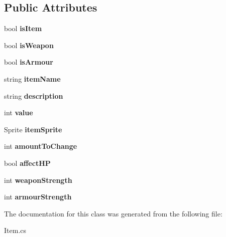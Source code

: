 \subsection*{Public Attributes}
\begin{DoxyCompactItemize}
\item 
\mbox{\label{class_item_ab0385c6416fcce30b328d5cbb98a6081}} 
bool {\bfseries is\+Item}
\item 
\mbox{\label{class_item_a6b69379b7bc2f3f8f6aa870b66a58269}} 
bool {\bfseries is\+Weapon}
\item 
\mbox{\label{class_item_ae8d843f6ba087f93cf5cecd4452add18}} 
bool {\bfseries is\+Armour}
\item 
\mbox{\label{class_item_a8c54f77a262b1ffd78c1cd8cbed86ae0}} 
string {\bfseries item\+Name}
\item 
\mbox{\label{class_item_af7647daec6254d11d76a857a212f729c}} 
string {\bfseries description}
\item 
\mbox{\label{class_item_a0495e4ae68c9b8eef643464e738ca1c0}} 
int {\bfseries value}
\item 
\mbox{\label{class_item_a44421abc0b4c4b806fc6000f03700393}} 
Sprite {\bfseries item\+Sprite}
\item 
\mbox{\label{class_item_a61c2ab155b873dfe4788bca6be8c8e62}} 
int {\bfseries amount\+To\+Change}
\item 
\mbox{\label{class_item_a7110df15c0d743bc335b6f51fc0ec113}} 
bool {\bfseries affect\+HP}
\item 
\mbox{\label{class_item_a98407f29b95c88ffd86b4d9ce029c530}} 
int {\bfseries weapon\+Strength}
\item 
\mbox{\label{class_item_ac84a78cdec7f402e7f7b9710923fe73c}} 
int {\bfseries armour\+Strength}
\end{DoxyCompactItemize}


The documentation for this class was generated from the following file\+:\begin{DoxyCompactItemize}
\item 
Item.\+cs\end{DoxyCompactItemize}
